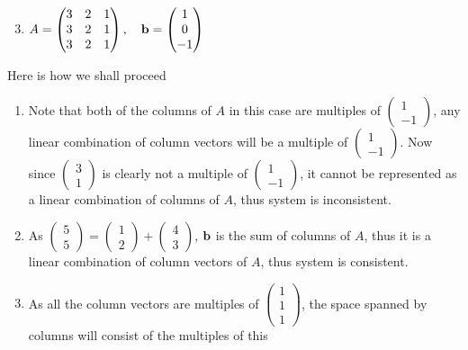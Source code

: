 \documentclass[8pt]{article} %
\begin{document}
\begin{description}
{	\begin{enumerate}[label=(\alph*)]
		\setcounter{enumi}{2}
		\item $A=\begin{pmatrix}3&2&1\\3&2&1\\3&2&1\end{pmatrix},\quad\mathbf{b}=\begin{pmatrix}1\\0\\-1\end{pmatrix}$
	\end{enumerate}
	Here is how we shall proceed
	\begin{enumerate}[label=(\alph*)]
			\newcommand{\icv}[1]{$\begin{pmatrix}#1\end{pmatrix}$}
		\item{Note that both of the columns of $A$ in this case are multiples of $\begin{pmatrix}1\\-1\end{pmatrix}$, any linear
			combination of column vectors will be a multiple
			of $\begin{pmatrix}1\\-1\end{pmatrix}$. Now since $\begin{pmatrix}3\\1\end{pmatrix}$ is clearly not
			a multiple of $\begin{pmatrix}1\\-1\end{pmatrix}$, it cannot be represented as a linear combination of 
			columns of $A$, thus system is inconsistent.}
		\item{As $\begin{pmatrix}5\\5\end{pmatrix}=\begin{pmatrix}1\\2\end{pmatrix}+\begin{pmatrix}4\\3\end{pmatrix}$, $\mathbf{b}$ is the
				sum of columns of $A$, thus it is a linear combination of column vectors of $A$, thus system is consistent.}
		\item As all the column vectors are multiples of \icv{1\\1\\1}, the space spanned by columns will consist of the multiples of this 

\end{enumerate}}
\end{description}
\end{document}
